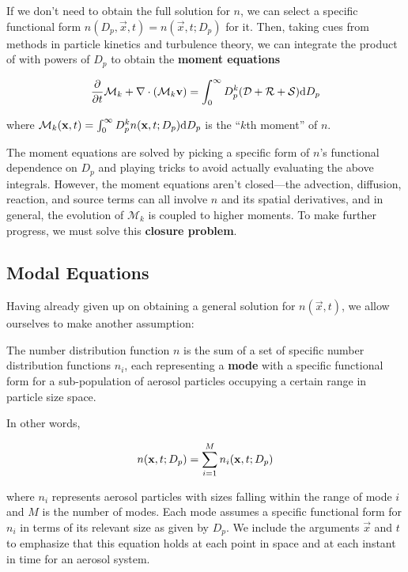 If we don't need to obtain the full solution for $n$, we can select a specific
functional form $n(D_p, \vec{x}, t) = n(\vec{x}, t; D_p)$ for it. Then, taking cues from
methods in particle kinetics and turbulence theory, we can integrate the product
of  with powers of $D_p$ to obtain the {\bf moment
equations}

\begin{equation}\labeleq{moments}
  \ddt{\mathcal{M}_k} + \div{(\mathcal{M}_k\vec{v})} = \int_0^{\infty} D_p^k (\mathcal{D} + \mathcal{R} + \mathcal{S}) \d{D_p}
\end{equation}

where $\mathcal{M}_k(\mathbf{x}, t) = \int_0^{\infty} D_p^k n(\mathbf{x}, t; D_p) \mathrm{d} D_p$
is the ``$k$th moment'' of $n$.

The moment equations are solved by picking a specific form of $n$'s functional
dependence on $D_p$ and playing tricks to avoid actually evaluating the
above integrals. However, the moment equations aren't closed---the advection,
diffusion, reaction, and source terms can all involve $n$ and its spatial
derivatives, and in general, the evolution of $\mathcal{M}_k$ is coupled to higher
moments. To make further progress, we must solve this {\bf closure problem}.

\subsection*{Modal Equations}

Having already given up on obtaining a general solution for $n(\vec{x}, t)$,
we allow ourselves to make another assumption:

\begin{assume}
  The number distribution function $n$ is the sum of a set of
        specific number distribution functions $n_i$, each representing a
        {\bf mode} with a specific functional form for a sub-population of
        aerosol particles occupying a certain range in particle size space.
\end{assume}
In other words,

\begin{equation}\labeleq{modal_n}
  n(\vec{x}, t; D_p) = \sum_{i=1}^M n_i(\vec{x}, t; D_p)
\end{equation}

where $n_i$ represents aerosol particles with sizes falling within the range
of mode $i$ and $M$ is the number of modes. Each mode assumes a specific
functional form for $n_i$ in terms of its relevant size as given by $D_p$.
We include the arguments $\vec{x}$ and $t$ to emphasize that this equation holds
at each point in space and at each instant in time for an aerosol system.

